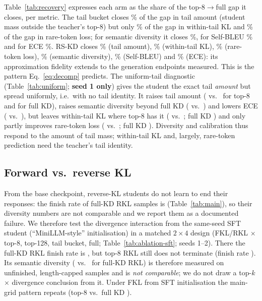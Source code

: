 \documentclass[11pt]{article}
\begin{document}
Table~\ref{tab:recovery} expresses each arm as the share of the top-8$\to$full gap it closes, per metric. The tail
bucket closes \RecTBAmount\% of the gap in tail amount (student mass outside the teacher's top-8) but only
\RecTBWithinTail\% of the gap in within-tail KL and \RecTBRare\% of the gap in rare-token loss; for semantic
diversity it closes \RecTBSemDiv\%, for Self-BLEU \RecTBSelfBleu\% and for ECE \RecTBECE\%. RS-KD closes
\RecRSAmount\% (tail amount), \RecRSWithinTail\% (within-tail KL), \RecRSRare\% (rare-token loss), \RecRSSemDiv\%
(semantic diversity), \RecRSSelfBleu\% (Self-BLEU) and \RecRSECE\% (ECE): its approximation fidelity extends to the
generation endpoints measured. This is the pattern Eq.~\ref{eq:decomp} predicts. The uniform-tail diagnostic (Table~\ref{tab:uniform}; \textbf{seed 1 only}) gives the student the exact tail
\emph{amount} but spread uniformly, i.e.\ with no tail identity. It raises tail amount (\UniAmount{} vs.\
\UTopAmount{} for top-8 and \UFullAmount{} for full KD), raises semantic diversity beyond full KD (\UniSemDiv{} vs.\
\UFullSemDiv{}) and lowers ECE (\UniECE{} vs.\ \UFullECE{}), but leaves within-tail KL where top-8 has it
(\UniWithinKL{} vs.\ \UTopWithinKL{}; full KD \UFullWithinKL{}) and only partly improves rare-token loss (\UniRare{}
vs.\ \UTopRare{}; full KD \UFullRare{}). Diversity and calibration thus respond to the amount of tail mass;
within-tail KL and, largely, rare-token prediction need the teacher's tail identity.

\subsection{Forward vs.\ reverse KL}\label{sec:rkl}
From the base checkpoint, reverse-KL students do not learn to end their responses: the finish rate of full-KD RKL
samples is \FinishRKLBase{} (Table~\ref{tab:main}), so their diversity numbers are not comparable and we report them
as a documented failure. We therefore test the divergence interaction from the same-seed SFT student
(``MiniLLM-style'' initialisation) in a matched $2\times4$ design (FKL/RKL $\times$ top-8, top-128, tail bucket,
full; Table~\ref{tab:ablation-sft}; seeds 1--2). There the full-KD RKL finish rate is \FinishRKLSFT{}, but top-8
RKL still does not terminate (finish rate \FinishTopEightRKLSFT{}). Its semantic diversity (\SFTTopEightRKLSemDiv{}
vs.\ \SFTFullRKLSemDiv{} for full-KD RKL) is therefore measured on unfinished, length-capped samples and is
\emph{not comparable}; we do not draw a top-$k$ $\times$ divergence conclusion from it. Under FKL from SFT
initialisation the main-grid pattern repeats (top-8 \SFTTopEightSemDiv{} vs.\ full KD \SFTFullSemDiv{}).
\end{document}
